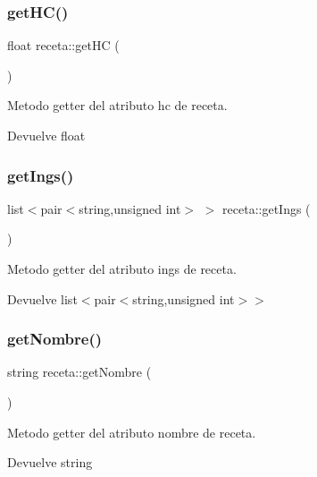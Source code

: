 \subsubsection{\texorpdfstring{get\+H\+C()}{getHC()}}
{\footnotesize\ttfamily float receta\+::get\+HC (\begin{DoxyParamCaption}{ }\end{DoxyParamCaption})}



Metodo getter del atributo hc de receta. 

\begin{DoxyReturn}{Devuelve}
float 
\end{DoxyReturn}
\mbox{\label{classreceta_aa9409169414a4ed26c1a95c515b6d541}} 
\subsubsection{\texorpdfstring{get\+Ings()}{getIngs()}}
{\footnotesize\ttfamily list$<$pair$<$string,unsigned int$>$ $>$ receta\+::get\+Ings (\begin{DoxyParamCaption}{ }\end{DoxyParamCaption})}



Metodo getter del atributo ings de receta. 

\begin{DoxyReturn}{Devuelve}
list$<$pair$<$string,unsigned int$>$$>$ 
\end{DoxyReturn}
\mbox{\label{classreceta_a1d19b209a379c7c94214829337a74794}} 
\subsubsection{\texorpdfstring{get\+Nombre()}{getNombre()}}
{\footnotesize\ttfamily string receta\+::get\+Nombre (\begin{DoxyParamCaption}{ }\end{DoxyParamCaption})}



Metodo getter del atributo nombre de receta. 

\begin{DoxyReturn}{Devuelve}
string 
\end{DoxyReturn}
\mbox{\label{classreceta_a735543a36eae6f38505b55acbfa1e8c3}} 
